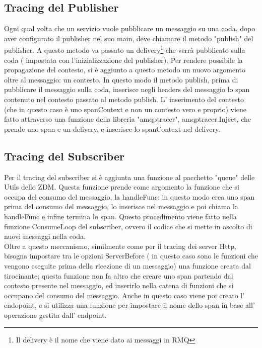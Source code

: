 \documentclass[a4paper,12pt,titlepage,italian,openany]{report}
\begin{document}
\subsection{Tracing del Publisher}
Ogni qual volta che un servizio vuole pubblicare un messaggio su una coda, dopo aver configurato il publisher nel suo main, deve chiamare il metodo "publish" del publisher. A questo metodo va passato un delivery\footnote{Il delivery è il nome che viene dato ai messaggi in RMQ\cite{rabbit:1}} che verrà pubblicato sulla coda ( impostata con l'inizializzazione del publisher). Per rendere possibile la propagazione del contesto, si è aggiunto a questo metodo un nuovo argomento oltre al messaggio: un contesto. In questo modo il metodo publish, prima di pubblicare il messaggio sulla coda, inserisce negli headers del messaggio lo span contenuto nel contesto passato al metodo publish.
L' inserimento del contesto (che in questo caso è uno spanContext e non un contesto vero e proprio) viene fatto attraverso una funzione della libreria "amqptracer", amqptracer.Inject, che prende uno span e un delivery, e inserisce lo spanContext nel delivery.
\subsection{Tracing del Subscriber}
Per il tracing del subscriber si è aggiunta una funzione al pacchetto "queue" delle Utils dello ZDM\cite{zdm:1}. Questa funzione prende come argomento la funzione che si occupa del consumo del messaggio, la handleFunc:
in questo modo crea uno span prima del consumo del messaggio, lo inserisce nel messaggio e poi chiama la handleFunc e infine termina lo span. Questo procedimento viene fatto nella funzione ConsumeLoop del subscriber, ovvero il codice che si mette in ascolto di nuovi messaggi nella coda.
\\Oltre a questo meccanismo, similmente come per il tracing dei server Http, bisogna impostare tra le opzioni ServerBefore ( in questo caso sono le funzioni che vengono eseguite prima della ricezione di un messaggio) una funzione creata dal tirocinante; questa funzione non fa altro che creare uno span partendo dal contesto presente nel messaggio, ed inserirlo nella catena di funzioni che si 
occupano del consumo del messaggio. Anche in questo caso viene poi creato l' endopoint,  e si utilizza una funzione per impostare il nome dello span in base all' operazione gestita dall' endpoint.

\newpage
\end{document}
